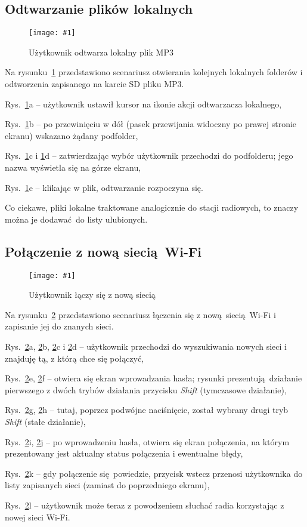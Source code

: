 \documentclass[polish]{aghengthesis}
\let\tempone\itemize
\let\temptwo\enditemize
\renewenvironment{itemize}{\tempone\setlength{\itemsep}{0cm}}{\temptwo}
\newcommand{\imgint}[4]{
	\begin{figure}[{#4}]
		\centering
		\texttt{[image: \#1]}
		\caption{#2}
		\label{#1}
	\end{figure}
}
\newcommand{\imgh}[3]{\imgint{#1}{#2}{#3}{H}}
\begin{document}
		\subsection{Odtwarzanie plików lokalnych}
			\imgh{5/PicoRadio-fl-local}{Użytkownik odtwarza lokalny plik MP3}{0.9}
			\newcommand{\rflocal}[1]{\ref{5/PicoRadio-fl-local}#1}
			
			Na rysunku~\rflocal{} przedstawiono scenariusz otwierania kolejnych lokalnych folderów i odtworzenia zapisanego na karcie SD pliku MP3.
			
			\begin{itemize}
				\item Rys.~\rflocal{a} -- użytkownik ustawił kursor na ikonie akcji odtwarzacza lokalnego,
				\item Rys.~\rflocal{b} -- po przewinięciu w dół (pasek przewijania widoczny po prawej stronie ekranu) wskazano żądany podfolder,
				\item Rys.~\rflocal{c} i \rflocal{d} -- zatwierdzając wybór użytkownik przechodzi do podfolderu; jego nazwa wyświetla się na górze ekranu,
				\item Rys.~\rflocal{e} -- klikając w plik, odtwarzanie rozpoczyna się.
			\end{itemize}
			
			Co ciekawe, pliki lokalne traktowane analogicznie do stacji radiowych, to znaczy można je dodawać do listy ulubionych.
			
		\subsection{Połączenie z nową siecią Wi-Fi}
			\imgh{5/PicoRadio-fl-wifi}{Użytkownik łączy się z nową siecią}{0.9}
			\newcommand{\rflwifi}[1]{\ref{5/PicoRadio-fl-wifi}#1}
			
			Na rysunku~\rflwifi{} przedstawiono scenariusz łączenia się z nową siecią Wi-Fi i zapisanie jej do znanych sieci.
			
			\begin{itemize}
				\item Rys.~\rflwifi{a}, \rflwifi{b}, \rflwifi{c} i \rflwifi{d} -- użytkownik przechodzi do wyszukiwania nowych sieci i znajduję tą, z którą chce się połączyć,
				\item Rys.~\rflwifi{e}, \rflwifi{f} -- otwiera się ekran wprowadzania hasła; rysunki prezentują działanie pierwszego z dwóch trybów działania przycisku \textit{Shift} (tymczasowe działanie),
				\item Rys.~\rflwifi{g}, \rflwifi{h} -- tutaj, poprzez podwójne naciśnięcie, został wybrany drugi tryb \textit{Shift} (stałe działanie),
				\item Rys.~\rflwifi{i}, \rflwifi{j} -- po wprowadzeniu hasła, otwiera się ekran połączenia, na którym prezentowany jest aktualny status połączenia i ewentualne błędy,
				\item Rys.~\rflwifi{k} -- gdy połączenie się powiedzie, przycisk wstecz przenosi użytkownika do listy zapisanych sieci (zamiast do poprzedniego ekranu),
				\item Rys.~\rflwifi{l} -- użytkownik może teraz z powodzeniem słuchać radia korzystając z nowej sieci Wi-Fi.
			\end{itemize}
			
\end{document}
